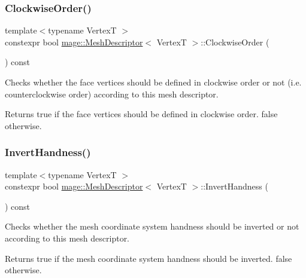 \subsubsection{\texorpdfstring{Clockwise\+Order()}{ClockwiseOrder()}}
{\footnotesize\ttfamily template$<$typename VertexT $>$ \\
constexpr bool \hyperlink{structmage_1_1_mesh_descriptor}{mage\+::\+Mesh\+Descriptor}$<$ VertexT $>$\+::Clockwise\+Order (\begin{DoxyParamCaption}{ }\end{DoxyParamCaption}) const\hspace{0.3cm}{\ttfamily [noexcept]}}

Checks whether the face vertices should be defined in clockwise order or not (i.\+e. counterclockwise order) according to this mesh descriptor.

\begin{DoxyReturn}{Returns}
{\ttfamily true} if the face vertices should be defined in clockwise order. {\ttfamily false} otherwise. 
\end{DoxyReturn}
\hypertarget{structmage_1_1_mesh_descriptor_ac3caa13f3da024ca3aa1a228ebaacc53}{}\label{structmage_1_1_mesh_descriptor_ac3caa13f3da024ca3aa1a228ebaacc53} 
\subsubsection{\texorpdfstring{Invert\+Handness()}{InvertHandness()}}
{\footnotesize\ttfamily template$<$typename VertexT $>$ \\
constexpr bool \hyperlink{structmage_1_1_mesh_descriptor}{mage\+::\+Mesh\+Descriptor}$<$ VertexT $>$\+::Invert\+Handness (\begin{DoxyParamCaption}{ }\end{DoxyParamCaption}) const\hspace{0.3cm}{\ttfamily [noexcept]}}

Checks whether the mesh coordinate system handness should be inverted or not according to this mesh descriptor.

\begin{DoxyReturn}{Returns}
{\ttfamily true} if the mesh coordinate system handness should be inverted. {\ttfamily false} otherwise. 
\end{DoxyReturn}
\hypertarget{structmage_1_1_mesh_descriptor_a3831ecd926f70193fffb70c65ca9e8ff}{}\label{structmage_1_1_mesh_descriptor_a3831ecd926f70193fffb70c65ca9e8ff} 
